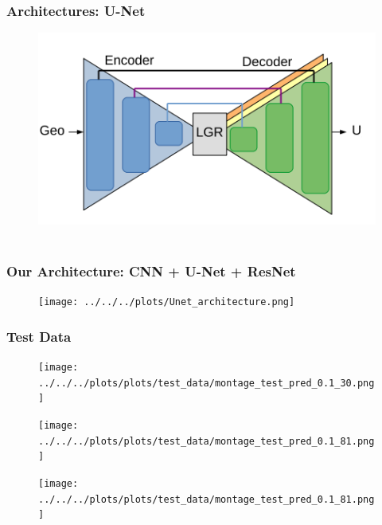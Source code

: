 \documentclass{beamer}
\begin{document}
\begin{frame}
\frametitle{Architectures: U-Net~\parencite{ronneberger2015u}}
\begin{figure}[h]
\includegraphics[width=12cm, trim = 0cm 0.0cm 0cm 0cm, clip]{img/UNet-1Encoder.png}
\caption{~\parencite{ribeiro2020deepcfd}}
\end{figure}
\end{frame}


\begin{frame}
\frametitle{Our Architecture: CNN + U-Net + ResNet}
\begin{figure}[h]
\hspace{-1cm}
\texttt{[image: ../../../plots/Unet\_architecture.png]}
\end{figure}
\end{frame}

\begin{frame}
\frametitle{Test Data \Smiley[1.5]}
\vspace{-0.40cm}
\begin{figure}[!htb]%
    \hspace{-0.55cm}
    \begin{minipage}{0.41\textwidth}%
       \texttt{[image: ../../../plots/plots/test\_data/montage\_test\_pred\_0.1\_30.png]}%
    \end{minipage}%
    \hspace{0.25cm}
    \begin{minipage}{0.41\textwidth}%
        \texttt{[image: ../../../plots/plots/test\_data/montage\_test\_pred\_0.1\_81.png]}%
    \end{minipage}%
    \hspace{0.1cm}
    \begin{minipage}{0.1\textwidth}%
        \vspace{1.75cm}
        \texttt{[image: ../../../plots/plots/test\_data/montage\_test\_pred\_0.1\_81.png]}%
    \end{minipage}%
\end{figure}
\end{frame}
\end{document}
